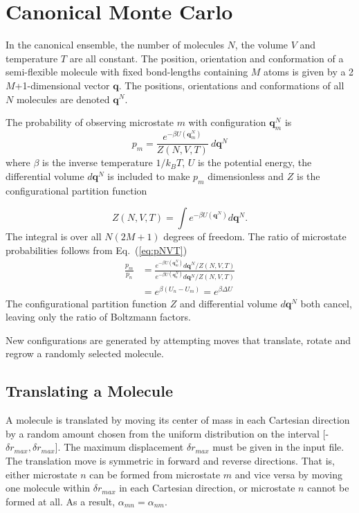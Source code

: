 \section{Canonical Monte Carlo}
\label{sec:NVT}
In the canonical ensemble, the number of molecules $N$, the volume $V$ and temperature $T$ are all constant. The position, orientation and conformation of a semi-flexible molecule with fixed bond-lengths containing $M$ atoms is given by a 2$M$+1-dimensional vector $\mathbf{q}$. The positions, orientations and conformations of all $N$ molecules are denoted $\mathbf{q}^N$.

The probability of observing microstate $m$ with configuration $\mathbf{q}_m^N$ is
\begin{equation}
\label{eq:pNVT}
p_m = \frac{e^{-\beta U\left(\mathbf{q}_m^N\right)}}{Z(N,V,T)}\ d\mathbf{q}^N
\end{equation}
where $\beta$ is the inverse temperature $1/k_BT$, $U$ is the potential energy, the differential volume $d\mathbf{q}^N$ is included to make $p_m$ dimensionless and $Z$ is the configurational partition function

\begin{equation}
\label{eq:configPartitionFn_NVT}
Z(N,V,T) = \int e^{-\beta U(\mathbf{q}^N)} d\mathbf{q}^N.
\end{equation}
The integral is over all $N(2M+1)$ degrees of freedom. The ratio of microstate probabilities follows from Eq.\ (\ref{eq:pNVT})
\begin{align}
\label{eq:pNVT_ratio}
\frac{p_m}{p_n} &= \frac{e^{-\beta U\left(\mathbf{q}_m^N\right)} d\mathbf{q}^N/Z(N,V,T)}{e^{-\beta U\left(\mathbf{q}_n^N\right)} d\mathbf{q}^N/Z(N,V,T)} \nonumber \\
&= e^{\beta (U_n - U_m)} = e^{\beta \Delta U}
\end{align}
The configurational partition function $Z$ and differential volume $d\mathbf{q}^N$ both cancel, leaving only the ratio of Boltzmann factors.

New configurations are generated by attempting moves that translate, rotate and regrow a randomly selected molecule.

\subsection{Translating a Molecule}
\label{sec:translate}
A molecule is translated by moving its center of mass in each Cartesian direction by a random amount chosen from the uniform distribution on the interval [-$\delta r_{max},\delta r_{max}$]. The maximum displacement $\delta r_{max}$ must be given in the input file. The translation move is symmetric in forward and reverse directions. That is, either microstate $n$ can be formed from microstate $m$ and vice versa by moving one molecule within $\delta r_{max}$ in each Cartesian direction, or microstate $n$ cannot be formed at all. As a result, $\alpha_{mn} = \alpha_{nm}$.

